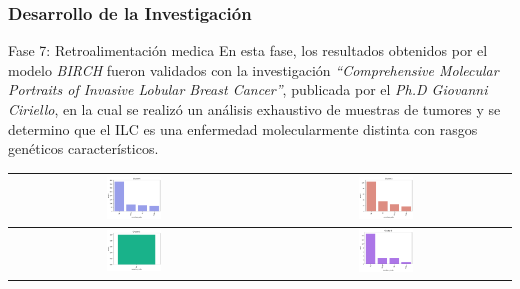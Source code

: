 \documentclass[xcolor=dvipsnames,xcolor=table,10pt]{beamer} %
\begin{document}
\begin{frame}
	\frametitle{Desarrollo de la Investigación}
	\begin{block}{Fase 7: Retroalimentación medica}\justifying
	En esta fase, los resultados obtenidos por el modelo \textit{BIRCH} fueron validados con la investigación \textit{“Comprehensive Molecular Portraits of Invasive Lobular Breast Cancer”}, publicada por el \textit{Ph.D Giovanni Ciriello}, en la cual se realizó un análisis exhaustivo de muestras de tumores y se determino que el ILC es una enfermedad molecularmente distinta con rasgos genéticos característicos.
	\end{block}
	
	\begin{table}[!htb]
		\begin{center} 
			\begin{tabular}{ |c|c| }
				\hline 
				\includegraphics[width=0.23\textwidth]{IMAGENES/BIRCH_CLUSTERING/1_Cluster_0_oncotree_code} 
				& \includegraphics[width=0.23\textwidth]{IMAGENES/BIRCH_CLUSTERING/1_Cluster_1_oncotree_code} 
				\\  \hline
				\includegraphics[width=0.23\textwidth]{IMAGENES/BIRCH_CLUSTERING/1_Cluster_2_oncotree_code} 
				& \includegraphics[width=0.23\textwidth]{IMAGENES/BIRCH_CLUSTERING/1_Cluster_3_oncotree_code} 
				\\  \hline            
			\end{tabular} 
		\end{center} 
	\end{table}
\end{frame}
\end{document}
